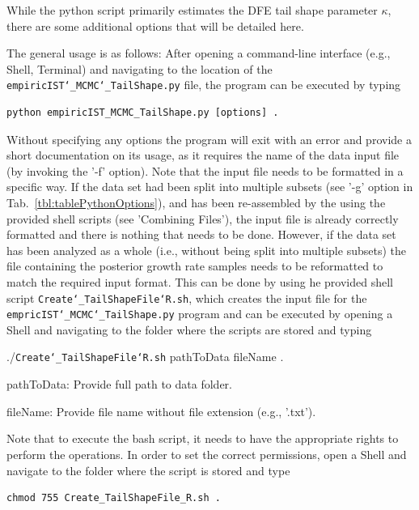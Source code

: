 \documentclass[12pt,a4paper]{scrartcl}
\begin{document}
While the python script primarily estimates the DFE tail shape parameter $\kappa$, there are some additional options that will be detailed here.

The general usage is as follows: After opening a command-line interface (e.g., Shell, Terminal) and navigating to the location of the \texttt{empiricIST\char`_MCMC\char`_TailShape.py} file, the program can be executed by typing

\begin{lstlisting}
python empiricIST_MCMC_TailShape.py [options] .
\end{lstlisting}

Without specifying any options the program will exit with an error and provide a short documentation on its usage, as it requires the name of the data input file (by invoking the '-f' option). 
Note that the input file needs to be formatted in a specific way. If the data set had been split into multiple subsets (see '-g' option in Tab.~\ref{tbl:tablePythonOptions}), and has been re-assembled by the using the provided shell scripts (see 'Combining Files'), the input file is already correctly formatted and there is nothing that needs to be done. However, if the data set has been analyzed as a whole (i.e., without being split into multiple subsets) the file containing the posterior growth rate samples needs to be reformatted to match the required input format.
This can be done by using he provided shell script \texttt{Create\char`_TailShapeFile\char`R.sh}, which creates the input file for the \texttt{empricIST\char`_MCMC\char`_TailShape.py} program and can be executed by opening a Shell and navigating to the folder where the scripts are stored and typing 

\vspace{0.05cm}
./\texttt{Create\char`_TailShapeFile\char`R.sh} pathToData fileName .
\vspace{0.05cm}

pathToData: Provide full path to data folder.
\vspace{0.05cm}

fileName: Provide file name without file extension (e.g., '.txt').
\vspace{0.05cm}

Note that to execute the bash script, it needs to have the appropriate rights to perform the operations. In order to set the correct permissions, open a Shell and navigate to the folder where the script is stored and type
\begin{lstlisting}[breaklines=true]
chmod 755 Create_TailShapeFile_R.sh .
\end{lstlisting}
\end{document}
